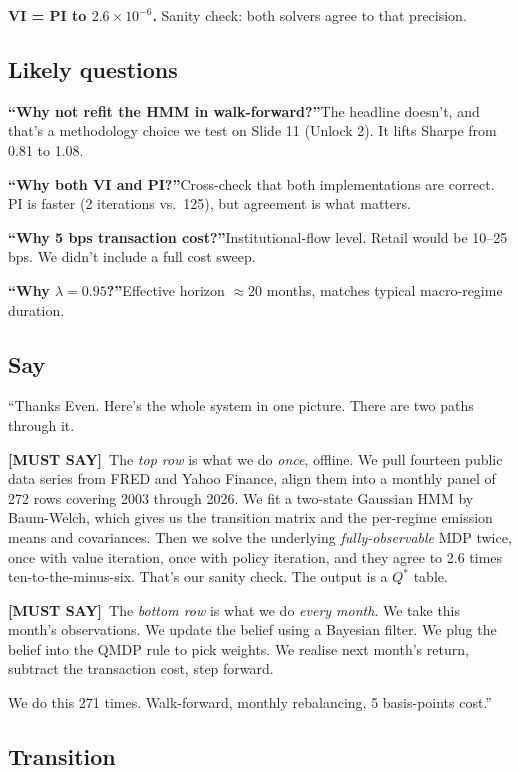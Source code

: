 \documentclass[11pt]{article}
\newcommand{\mustsay}[1]{\textcolor{must}{\textbf{[MUST SAY]}}\ #1}
\begin{document}
\textbf{VI = PI to $2.6\times 10^{-6}$.} Sanity check: both solvers agree to that precision.

\subsection*{Likely questions}

\textbf{``Why not refit the HMM in walk-forward?''}\quad The headline doesn't, and that's a methodology choice we test on Slide 11 (Unlock 2). It lifts Sharpe from 0.81 to 1.08.

\textbf{``Why both VI and PI?''}\quad Cross-check that both implementations are correct. PI is faster (2 iterations vs.\ 125), but agreement is what matters.

\textbf{``Why 5 bps transaction cost?''}\quad Institutional-flow level. Retail would be 10--25 bps. We didn't include a full cost sweep.

\textbf{``Why $\lambda = 0.95$?''}\quad Effective horizon $\approx 20$ months, matches typical macro-regime duration.

\subsection*{Say}

``Thanks Even. Here's the whole system in one picture. There are two paths through it.

\mustsay{The \emph{top row} is what we do \emph{once}, offline. We pull fourteen public data series from FRED and Yahoo Finance, align them into a monthly panel of 272 rows covering 2003 through 2026. We fit a two-state Gaussian HMM by Baum-Welch, which gives us the transition matrix and the per-regime emission means and covariances. Then we solve the underlying \emph{fully-observable} MDP twice, once with value iteration, once with policy iteration, and they agree to 2.6 times ten-to-the-minus-six. That's our sanity check. The output is a $Q^*$ table.}

\mustsay{The \emph{bottom row} is what we do \emph{every month}. We take this month's observations. We update the belief using a Bayesian filter. We plug the belief into the QMDP rule to pick weights. We realise next month's return, subtract the transaction cost, step forward.}

We do this 271 times. Walk-forward, monthly rebalancing, 5 basis-points cost.''

\subsection*{Transition}
\end{document}
